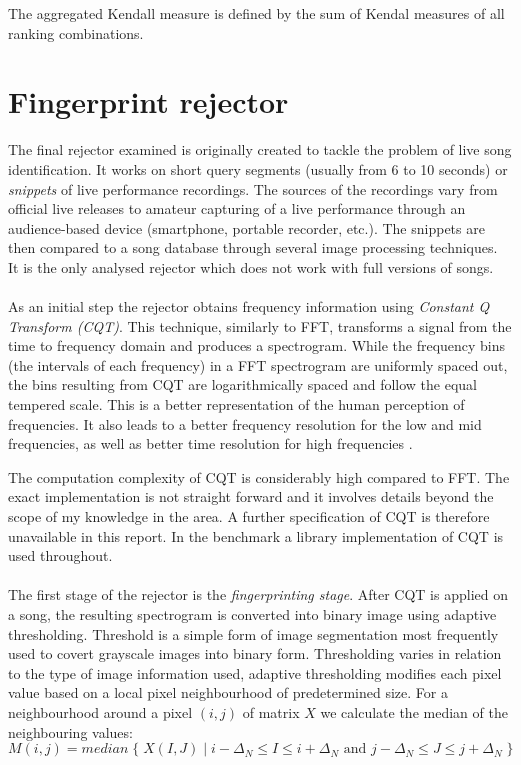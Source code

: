 The aggregated Kendall measure is defined by the sum of Kendal measures of
all ranking combinations.

\section{Fingerprint rejector} 
\label{sec:rafii}

The final rejector examined is originally created to tackle the problem of live
song identification. It works on short query segments (usually from 6 to 10
seconds) or \textit{snippets} of live performance recordings. The sources of the
recordings vary from official live releases to amateur capturing of a live
performance through an audience-based device (smartphone, portable recorder,
etc.). The snippets are then compared to a song database through several image
processing techniques. It is the only analysed rejector which does not work with
full versions of songs.

\paragraph{}
As an initial step the rejector obtains frequency information using
\textit{Constant Q Transform (CQT)}. This technique, similarly to FFT,
transforms a signal from the time to frequency domain and produces a
spectrogram. While the frequency bins (the intervals of each frequency) in a FFT
spectrogram are uniformly spaced out, the bins resulting from CQT are
logarithmically spaced and follow the equal tempered scale. This is a better
representation of the human perception of frequencies. It also leads to a better
frequency resolution for the low and mid frequencies, as well as better time
resolution for high frequencies \cite{schorkhuber2010constant}.

The computation complexity of CQT is considerably high compared to FFT. The
exact implementation is not straight forward and it involves details beyond the
scope of my knowledge in the area. A further specification of CQT is therefore
unavailable in this report. In the benchmark a library implementation of CQT is
used throughout.

\paragraph{}
The first stage of the rejector is the \textit{fingerprinting stage}. After CQT
is applied on a song, the resulting spectrogram is converted into binary image
using adaptive thresholding. Threshold is a simple form of image segmentation
most frequently used to covert grayscale images into binary form. Thresholding
varies in relation to the type of image information used, adaptive thresholding
modifies each pixel value based on a local pixel neighbourhood of predetermined
size. For a neighbourhood around a pixel $(i, j)$ of matrix $X$ we calculate the
median of the neighbouring values:
\begin{equation}
   M(i, j) = median\; \{\; X(I, J) \mid i-\Delta_N \leq I \leq i+\Delta_N \text{ and } j-\Delta_N \leq J \leq j+\Delta_N \; \}
\end{equation}

